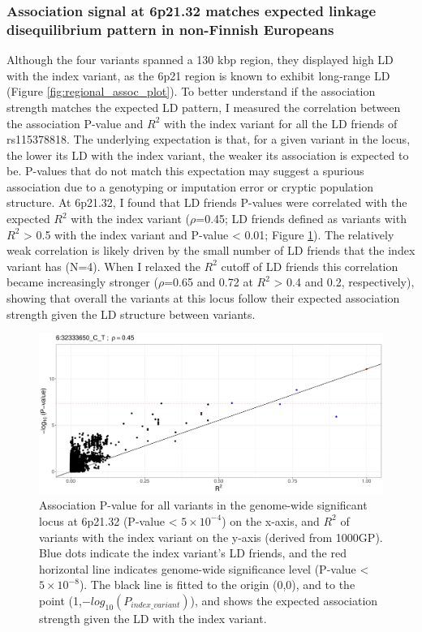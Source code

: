     \subsubsection{Association signal at 6p21.32 matches expected linkage disequilibrium pattern in non-Finnish Europeans}
    Although the four variants spanned a 130 kbp region, they displayed high LD with the index variant, as the 6p21 region is known to exhibit long-range LD (Figure \ref{fig:regional_assoc_plot}). To better understand if the association strength matches the expected LD pattern, I measured the correlation between the association P-value and $R^{2}$ with the index variant for all the LD friends of rs115378818. The underlying expectation is that, for a given variant in the locus, the lower its LD with the index variant, the weaker its association is expected to be. P-values that do not match this expectation may suggest a spurious association due to a genotyping or imputation error or cryptic population structure. At 6p21.32, I found that LD friends P-values were correlated with the expected $R^{2}$ with the index variant ($\rho$=0.45; LD friends defined as variants with $R^{2}$ > 0.5 with the index variant and P-value < 0.01; Figure \ref{fig:ld_pval_plot}). The relatively weak correlation is likely driven by the small number of LD friends that the index variant has (N=4). When I relaxed the $R^{2}$ cutoff of LD friends this correlation became increasingly stronger ($\rho$=0.65 and 0.72 at $R^{2}$ > 0.4 and 0.2, respectively), showing that overall the variants at this locus follow their expected association strength given the LD structure between variants. 




    \begin{figure}[H] 
      \centering    
      \includegraphics[width=1.0\textwidth]{fig3}
      \caption[LD decay plot of the 6p21.32 locus]{Association P-value for all variants in the genome-wide significant locus at 6p21.32 (P-value < $5\times10^{-4}$) on the x-axis, and $R^{2}$ of variants with the index variant on the y-axis (derived from 1000GP). Blue dots indicate the index variant's LD friends, and the red horizontal line indicates genome-wide significance level (P-value < $5\times10^{-8}$). The black line is fitted to the origin (0,0), and to the point (1,$-log_{10}(P_{index\_variant})$), and shows the expected association strength given the LD with the index variant.}
      \label{fig:ld_pval_plot}
      \end{figure}


